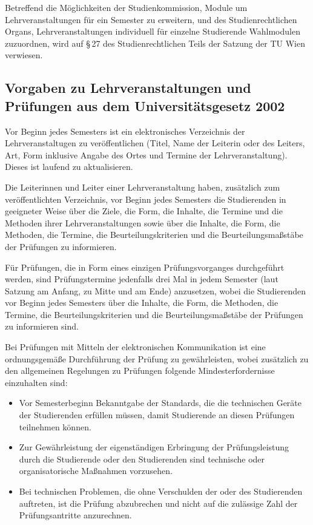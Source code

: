 Betreffend die Möglichkeiten der Studienkommission, Module um
Lehrveranstaltungen für ein Semester zu erweitern, und des
Studienrechtlichen Organs, Lehrveranstaltungen individuell für
einzelne Studierende Wahlmodulen zuzuordnen, wird auf §\,27
des Studienrechtlichen Teils der Satzung der TU Wien verwiesen.

\subsection*{Vorgaben zu Lehrveranstaltungen und Prüfungen aus dem
  Universitätsgesetz 2002}

Vor Beginn jedes Semesters ist ein elektronisches Verzeichnis der
Lehrveranstaltugen zu veröffentlichen (Titel, Name der Leiterin oder
des Leiters, Art, Form inklusive Angabe des Ortes und Termine der
Lehrveranstaltung). Dieses ist laufend zu aktualisieren.

Die Leiterinnen und Leiter einer Lehrveranstaltung haben, zusätzlich
zum veröffentlichten Verzeichnis, vor Beginn jedes Semesters die
Studierenden in geeigneter Weise über die Ziele, die Form, die
Inhalte, die Termine und die Methoden ihrer Lehrveranstaltungen sowie
über die Inhalte, die Form, die Methoden, die Termine, die
Beurteilungskriterien und die Beurteilungsmaßstäbe der Prüfungen zu
informieren.

Für Prüfungen, die in Form eines einzigen Prüfungsvorganges
durchgeführt werden, sind Prüfungstermine jedenfalls drei Mal in jedem
Semester (laut Satzung am Anfang, zu Mitte und am Ende) anzusetzen,
wobei die Studierenden vor Beginn jedes Semesters über die Inhalte,
die Form, die Methoden, die Termine, die Beurteilungskriterien und die
Beurteilungsmaßstäbe der Prüfungen zu informieren sind.

Bei Prüfungen mit Mitteln der elektronischen Kommunikation ist eine
ordnungsgemäße Durchführung der Prüfung zu gewährleisten, wobei
zusätzlich zu den allgemeinen Regelungen zu Prüfungen folgende
Mindesterfordernisse einzuhalten sind:
\begin{itemize}
\item Vor Semesterbeginn Bekanntgabe der Standards, die die
  technischen Geräte der Studierenden erfüllen müssen, damit
  Studierende an diesen Prüfungen teilnehmen können.
\item Zur Gewährleistung der eigenständigen Erbringung der
  Prüfungsleistung durch die Studierende oder den Studierenden sind
  technische oder organisatorische Maßnahmen vorzusehen.
\item Bei technischen Problemen, die ohne Verschulden der oder des
  Studierenden auftreten, ist die Prüfung abzubrechen und nicht auf
  die zulässige Zahl der Prüfungsantritte anzurechnen.
\end{itemize}

